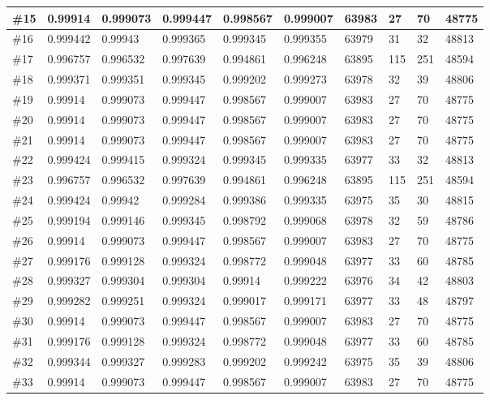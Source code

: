 \begin{longtable}{l|l|l|l|l|l|l|l|l|l}
\#15 & 0.99914  & 0.999073 & 0.999447 & 0.998567 & 0.999007 & 63983 & 27  & 70  & 48775 \\ \hline
\#16 & 0.999442 & 0.99943  & 0.999365 & 0.999345 & 0.999355 & 63979 & 31  & 32  & 48813 \\ \hline
\#17 & 0.996757 & 0.996532 & 0.997639 & 0.994861 & 0.996248 & 63895 & 115 & 251 & 48594 \\ \hline
\#18 & 0.999371 & 0.999351 & 0.999345 & 0.999202 & 0.999273 & 63978 & 32  & 39  & 48806 \\ \hline
\#19 & 0.99914  & 0.999073 & 0.999447 & 0.998567 & 0.999007 & 63983 & 27  & 70  & 48775 \\ \hline
\#20 & 0.99914  & 0.999073 & 0.999447 & 0.998567 & 0.999007 & 63983 & 27  & 70  & 48775 \\ \hline
\#21 & 0.99914  & 0.999073 & 0.999447 & 0.998567 & 0.999007 & 63983 & 27  & 70  & 48775 \\ \hline
\#22 & 0.999424 & 0.999415 & 0.999324 & 0.999345 & 0.999335 & 63977 & 33  & 32  & 48813 \\ \hline
\#23 & 0.996757 & 0.996532 & 0.997639 & 0.994861 & 0.996248 & 63895 & 115 & 251 & 48594 \\ \hline
\#24 & 0.999424 & 0.99942  & 0.999284 & 0.999386 & 0.999335 & 63975 & 35  & 30  & 48815 \\ \hline
\#25 & 0.999194 & 0.999146 & 0.999345 & 0.998792 & 0.999068 & 63978 & 32  & 59  & 48786 \\ \hline
\#26 & 0.99914  & 0.999073 & 0.999447 & 0.998567 & 0.999007 & 63983 & 27  & 70  & 48775 \\ \hline
\#27 & 0.999176 & 0.999128 & 0.999324 & 0.998772 & 0.999048 & 63977 & 33  & 60  & 48785 \\ \hline
\#28 & 0.999327 & 0.999304 & 0.999304 & 0.99914  & 0.999222 & 63976 & 34  & 42  & 48803 \\ \hline
\#29 & 0.999282 & 0.999251 & 0.999324 & 0.999017 & 0.999171 & 63977 & 33  & 48  & 48797 \\ \hline
\#30 & 0.99914  & 0.999073 & 0.999447 & 0.998567 & 0.999007 & 63983 & 27  & 70  & 48775 \\ \hline
\#31 & 0.999176 & 0.999128 & 0.999324 & 0.998772 & 0.999048 & 63977 & 33  & 60  & 48785 \\ \hline
\#32 & 0.999344 & 0.999327 & 0.999283 & 0.999202 & 0.999242 & 63975 & 35  & 39  & 48806 \\ \hline
\#33 & 0.99914  & 0.999073 & 0.999447 & 0.998567 & 0.999007 & 63983 & 27  & 70  & 48775 \\ \hline

\end{longtable}
